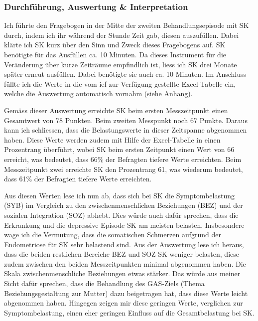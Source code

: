 \subsubsection{Durchführung, Auswertung \& Interpretation}
Ich führte den Fragebogen in der Mitte der zweiten Behandlungsepisode mit SK durch, indem ich ihr während der Stunde Zeit gab, diesen auszufüllen. Dabei klärte ich SK kurz über den Sinn und Zweck dieses Fragebogens auf. SK benötigte für das Ausfüllen ca. 10 Minuten. Da dieses Instrument für die Veränderung über kurze Zeiträume empfindlich ist, liess ich SK drei Monate später erneut ausfüllen. Dabei benötigte sie auch ca. 10 Minuten. Im Anschluss füllte ich die Werte in die vom \ac{ief} zur Verfügung gestellte Excel-Tabelle ein, welche die Auswertung automatisch vornahm (siehe Anhang). 

Gemäss dieser Auswertung erreichte SK beim ersten Messzeitpunkt einen Gesamtwert von 78 Punkten. Beim zweiten Messpunkt noch 67 Punkte. Daraus kann ich schliessen, dass die Belastungswerte in dieser Zeitspanne abgenommen haben. Diese Werte werden zudem mit Hilfe der Excel-Tabelle in einen Prozentrang überführt, wobei SK beim ersten Zeitpunkt einen Wert von 66 erreicht, was bedeutet, dass 66\% der Befragten tiefere Werte erreichten. Beim Messzeitpunkt zwei erreichte SK den Prozentrang 61, was wiederum bedeutet, dass 61\% der Befragten tiefere Werte erreichten. 

Aus diesen Werten lese ich nun ab, dass sich bei SK die Symptombelastung (SYB) im Vergleich zu den zwischenmenschlichen Beziehungen (BEZ) und der sozialen Integration (SOZ) abhebt. Dies würde auch dafür sprechen, dass die Erkrankung und die depressive Episode SK am meisten belasten. Insbesondere wage ich die Vermutung, dass die somatischen Schmerzen aufgrund der Endometriose für SK sehr belastend sind. Aus der Auswertung lese ich heraus, dass die beiden restlichen Bereiche BEZ und SOZ SK weniger belasten, diese zudem zwischen den beiden  Messzeitpunkten minimal abgenommen haben. Die Skala zwischenmenschliche Beziehungen etwas stärker. Das würde aus meiner Sicht dafür sprechen, dass die Behandlung des GAS-Ziels (Thema Beziehungsgestaltung zur Mutter) dazu beigetragen hat, dass diese Werte leicht abgenommen haben. Hingegen zeigen mir diese geringen Werte, verglichen zur Symptombelastung, einen eher geringen Einfluss auf die Gesamtbelastung bei SK.  

